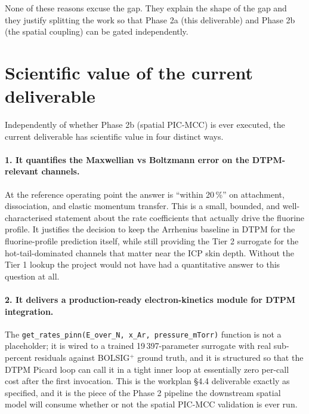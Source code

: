 \documentclass[11pt,a4paper]{article}
\begin{document}
None of these reasons excuse the gap. They explain the shape of the
gap and they justify splitting the work so that Phase 2a (this
deliverable) and Phase 2b (the spatial coupling) can be gated
independently.

\section{Scientific value of the current deliverable}
\label{sec:value}

Independently of whether Phase 2b (spatial PIC-MCC) is ever
executed, the current deliverable has scientific value in four
distinct ways.

\paragraph{1. It quantifies the Maxwellian vs Boltzmann error on
the DTPM-relevant channels.} At the reference operating point the
answer is ``within 20\,\%'' on attachment, dissociation, and
elastic momentum transfer. This is a small, bounded, and
well-characterised statement about the rate coefficients that
actually drive the fluorine profile. It justifies the decision to
keep the Arrhenius baseline in DTPM for the fluorine-profile
prediction itself, while still providing the Tier 2 surrogate for
the hot-tail-dominated channels that matter near the ICP skin
depth. Without the Tier 1 lookup the project would not have had a
quantitative answer to this question at all.

\paragraph{2. It delivers a production-ready electron-kinetics
module for DTPM integration.} The
\texttt{get\_rates\_pinn(E\_over\_N, x\_Ar, pressure\_mTorr)}
function is not a placeholder; it is wired to a trained
19\,397-parameter surrogate with real sub-percent residuals against
BOLSIG$^+$ ground truth, and it is structured so that the DTPM
Picard loop can call it in a tight inner loop at essentially zero
per-call cost after the first invocation. This is the workplan
§4.4 deliverable exactly as specified, and it is the piece of the
Phase 2 pipeline the downstream spatial model will consume whether
or not the spatial PIC-MCC validation is ever run.
\end{document}
